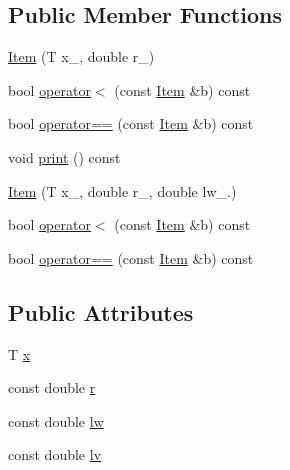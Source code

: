 \subsection*{Public Member Functions}
\begin{DoxyCompactItemize}
\item 
\hyperlink{class_fleet_1_1_statistics_1_1_reservoir_sample_1_1_item_a355a3b655f4aa8e9cd151cb46054ee0e}{Item} (T x\+\_\+, double r\+\_\+)
\item 
bool \hyperlink{class_fleet_1_1_statistics_1_1_reservoir_sample_1_1_item_a06bf92e43a3bfe61e75a8bf0d6fa2c67}{operator$<$} (const \hyperlink{class_fleet_1_1_statistics_1_1_reservoir_sample_1_1_item}{Item} \&b) const
\item 
bool \hyperlink{class_fleet_1_1_statistics_1_1_reservoir_sample_1_1_item_ab3adc1f593aec74d7d140f8c3553546e}{operator==} (const \hyperlink{class_fleet_1_1_statistics_1_1_reservoir_sample_1_1_item}{Item} \&b) const
\item 
void \hyperlink{class_fleet_1_1_statistics_1_1_reservoir_sample_1_1_item_a9cbecacee3b118d645d3f9a42782382b}{print} () const
\item 
\hyperlink{class_fleet_1_1_statistics_1_1_reservoir_sample_1_1_item_acad6abfadffe65005f14a4c9616aabde}{Item} (T x\+\_\+, double r\+\_\+, double lw\+\_.)
\item 
bool \hyperlink{class_fleet_1_1_statistics_1_1_reservoir_sample_1_1_item_a06bf92e43a3bfe61e75a8bf0d6fa2c67}{operator$<$} (const \hyperlink{class_fleet_1_1_statistics_1_1_reservoir_sample_1_1_item}{Item} \&b) const
\item 
bool \hyperlink{class_fleet_1_1_statistics_1_1_reservoir_sample_1_1_item_ab3adc1f593aec74d7d140f8c3553546e}{operator==} (const \hyperlink{class_fleet_1_1_statistics_1_1_reservoir_sample_1_1_item}{Item} \&b) const
\end{DoxyCompactItemize}
\subsection*{Public Attributes}
\begin{DoxyCompactItemize}
\item 
T \hyperlink{class_fleet_1_1_statistics_1_1_reservoir_sample_1_1_item_ae845a0d698a99e1508241fd25b63dd3a}{x}
\item 
const double \hyperlink{class_fleet_1_1_statistics_1_1_reservoir_sample_1_1_item_a45c460752bf4e0b27ee406d2560479da}{r}
\item 
const double \hyperlink{class_fleet_1_1_statistics_1_1_reservoir_sample_1_1_item_af6e0c0e3569786a8896fcd7ab758a587}{lw}
\item 
const double \hyperlink{class_fleet_1_1_statistics_1_1_reservoir_sample_1_1_item_a0037b193d6712481b90416b51f2eb9d5}{lv}
\end{DoxyCompactItemize}


